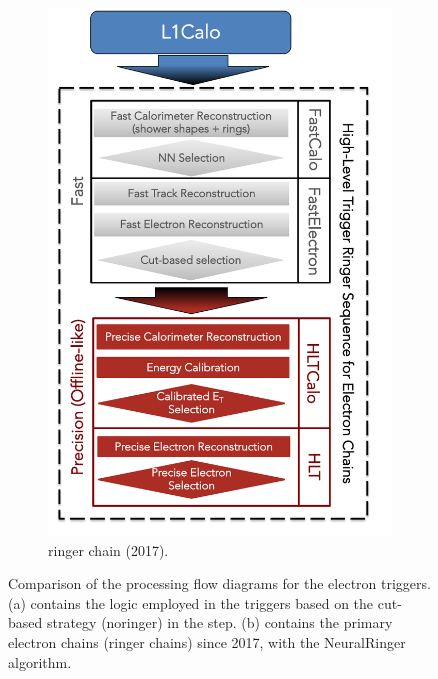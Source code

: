 \begin{figure}[h!tb]
\begin{center}
\begin{subfigure}[c]{.48\textwidth}
  \includegraphics[width=\textwidth]{sections/context/figures/ElectronChain_Run2_ringer.pdf}
  \caption{ringer chain (2017).}
  \end{subfigure}
  \caption{Comparison of the processing flow diagrams for the electron triggers. (a)
  contains the logic employed in the triggers based on the cut-based strategy
  (noringer) in the \fastcalo step. (b) contains the primary electron
  chains (ringer chains) since 2017, with the NeuralRinger algorithm.}%
  \label{fig:ringer_chains}
  \end{center}
\end{figure}

  
